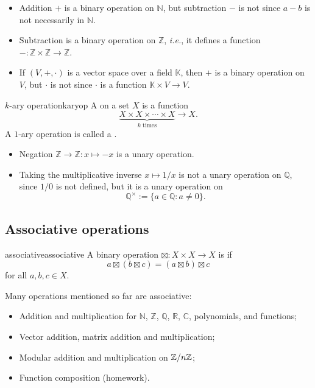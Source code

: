 \documentclass[12pt,letterpaper]{report}
\begin{document}
\begin{ex}
  \begin{itemize}
    \item
    Addition $+$ is a binary operation on $\mathbb{N}$, but subtraction $-$ is not since $a - b$ is
    not necessarily in $\mathbb{N}$.
    \item
    Subtraction is a binary operation on $\mathbb{Z}$, \emph{i.e.}, it defines a function
    $- \colon \mathbb{Z} \times \mathbb{Z} \to \mathbb{Z}$.
    \item
    If $(V, +, \cdot)$ is a vector space over a field $\mathbb{K}$, then $+$ is a binary operation
    on $V$, but $\cdot$ is not since $\cdot$ is a function $\mathbb{K} \times V \to V$.
  \end{itemize}
\end{ex}

\begin{defn}{$k$-ary operation}{karyop}
  A  on a set $X$ is a function
  \[
    \underbrace{X \times X \times \cdots \times X}_{k \text{ times}} \to X.
  \]
  A $1$-ary operation is called a .
\end{defn}

\begin{ex}
  \begin{itemize}
    \item
    Negation $\mathbb{Z} \to \mathbb{Z} : x \mapsto -x$ is a unary operation.
    \item
    Taking the multiplicative inverse $x \mapsto 1/x$ is not a unary operation on $\mathbb{Q}$,
    since $1/0$ is not defined, but it is a unary operation on
    \[ \mathbb{Q}^\times := \{ a \in \mathbb{Q} : a \neq 0 \}. \]
  \end{itemize}
\end{ex}

\pagebreak
\subsection{Associative operations}

\begin{defn}{associative}{associative}
  A binary operation $\boxtimes \colon X \times X \to X$ is  if
  \[
    a \boxtimes (b \boxtimes c) = (a \boxtimes b) \boxtimes c
  \]
  for all $a, b, c \in X$.
\end{defn}

Many operations mentioned so far are associative:
\begin{itemize}
  \item
  Addition and multiplication for $\mathbb{N}$, $\mathbb{Z}$, $\mathbb{Q}$, $\mathbb{R}$,
  $\mathbb{C}$, polynomials, and functions;
  \item
  Vector addition, matrix addition and multiplication;
  \item
  Modular addition and multiplication on $\mathbb{Z}/{n}\mathbb{Z}$;
  \item
  Function composition (homework).
\end{itemize}
\end{document}

